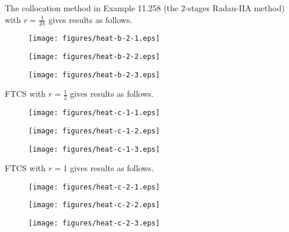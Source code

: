 \documentclass[twocolumn,10pt]{article}
\begin{document}
The collocation method in Example 11.258 (the $2$-stages Radau-IIA method) with $r=\frac{1}{2h}$ gives results as follows.

\vspace{-.3em}\begin{figure}[H]
    \centering
    \begin{minipage}[t]{0.32\linewidth}
        \centering
        \texttt{[image: figures/heat-b-2-1.eps]}
    \end{minipage}
    \begin{minipage}[t]{0.32\linewidth}
        \centering
        \texttt{[image: figures/heat-b-2-2.eps]}
    \end{minipage}
    \begin{minipage}[t]{0.32\linewidth}
        \centering
        \texttt{[image: figures/heat-b-2-3.eps]}
    \end{minipage}
\end{figure} \vspace{-.5em}

FTCS with $r=\frac{1}{2}$ gives results as follows.

\vspace{-.3em}\begin{figure}[H]
    \centering
    \begin{minipage}[t]{0.32\linewidth}
        \centering
        \texttt{[image: figures/heat-c-1-1.eps]}
    \end{minipage}
    \begin{minipage}[t]{0.32\linewidth}
        \centering
        \texttt{[image: figures/heat-c-1-2.eps]}
    \end{minipage}
    \begin{minipage}[t]{0.32\linewidth}
        \centering
        \texttt{[image: figures/heat-c-1-3.eps]}
    \end{minipage}
\end{figure} \vspace{-.5em}

FTCS with $r=1$ gives results as follows.

\vspace{-.3em}\begin{figure}[H]
    \centering
    \begin{minipage}[t]{0.32\linewidth}
        \centering
        \texttt{[image: figures/heat-c-2-1.eps]}
    \end{minipage}
    \begin{minipage}[t]{0.32\linewidth}
        \centering
        \texttt{[image: figures/heat-c-2-2.eps]}
    \end{minipage}
    \begin{minipage}[t]{0.32\linewidth}
        \centering
        \texttt{[image: figures/heat-c-2-3.eps]}
    \end{minipage}
\end{figure} \vspace{-.5em}
\end{document}
